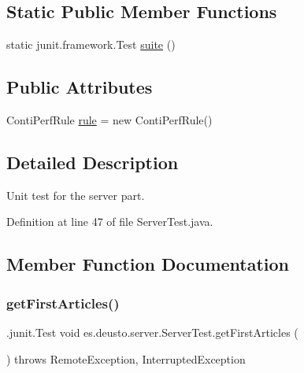 \subsection*{Static Public Member Functions}
\begin{DoxyCompactItemize}
\item 
static junit.\+framework.\+Test \hyperlink{classes_1_1deusto_1_1server_1_1_server_test_a395162326c0f8b35291916b6427e697a}{suite} ()
\end{DoxyCompactItemize}
\subsection*{Public Attributes}
\begin{DoxyCompactItemize}
\item 
Conti\+Perf\+Rule \hyperlink{classes_1_1deusto_1_1server_1_1_server_test_ab2224d0a68cc9af1c1abded7e27f4241}{rule} = new Conti\+Perf\+Rule()
\end{DoxyCompactItemize}


\subsection{Detailed Description}
Unit test for the server part. 

Definition at line 47 of file Server\+Test.\+java.



\subsection{Member Function Documentation}
\mbox{\label{classes_1_1deusto_1_1server_1_1_server_test_a3e97ef887212fc0047e556559d9677ba}} 
\subsubsection{\texorpdfstring{get\+First\+Articles()}{getFirstArticles()}}
{\footnotesize\ttfamily .junit.\+Test void es.\+deusto.\+server.\+Server\+Test.\+get\+First\+Articles (\begin{DoxyParamCaption}{ }\end{DoxyParamCaption}) throws Remote\+Exception, Interrupted\+Exception}



